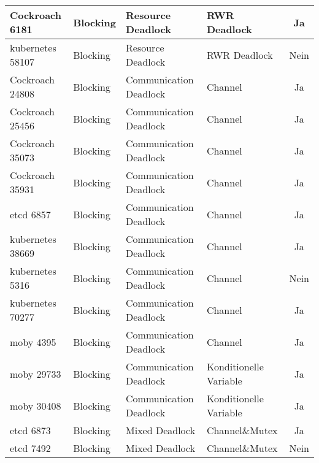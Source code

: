 \begin{longtable}[c]{|l|l|l|l|c|}
  Cockroach 6181            & Blocking      & Resource Deadlock      & RWR Deadlock           & Ja                                   \\ \hline
  kubernetes 58107           & Blocking      & Resource Deadlock      & RWR Deadlock           & Nein                                 \\ \hline
  Cockroach 24808           & Blocking      & Communication Deadlock & Channel                & Ja                                   \\ \hline
  Cockroach 25456           & Blocking      & Communication Deadlock & Channel                & Ja                                   \\ \hline
  Cockroach 35073           & Blocking      & Communication Deadlock & Channel                & Ja                                   \\ \hline
  Cockroach 35931           & Blocking      & Communication Deadlock & Channel                & Ja                                   \\ \hline
  etcd 6857            & Blocking      & Communication Deadlock & Channel                & Ja                                   \\ \hline
  kubernetes 38669           & Blocking      & Communication Deadlock & Channel                & Ja                                   \\ \hline
  kubernetes 5316            & Blocking      & Communication Deadlock & Channel                & Nein                                 \\ \hline
  kubernetes 70277           & Blocking      & Communication Deadlock & Channel                & Ja                                   \\ \hline
  moby 4395            & Blocking      & Communication Deadlock & Channel                & Ja                                   \\ \hline
  moby 29733           & Blocking      & Communication Deadlock & Konditionelle Variable & Ja                                   \\ \hline
  moby 30408           & Blocking      & Communication Deadlock & Konditionelle Variable & Ja                                   \\ \hline
  etcd 6873            & Blocking      & Mixed Deadlock         & Channel\&Mutex         & Ja                                   \\ \hline
  etcd 7492            & Blocking      & Mixed Deadlock         & Channel\&Mutex         & Nein                                 \\ \hline

\end{longtable}

